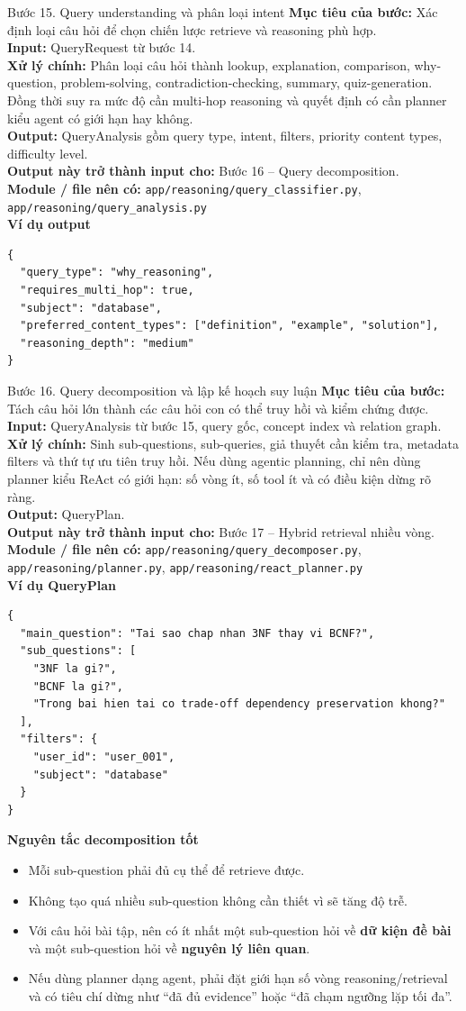 \documentclass[12pt,a4paper]{article}
\newcommand{\stepgoal}[1]{\textbf{Mục tiêu của bước:} #1\\}
\newcommand{\stepinput}[1]{\textbf{Input:} #1\\}
\newcommand{\stepprocess}[1]{\textbf{Xử lý chính:} #1\\}
\newcommand{\stepoutput}[1]{\textbf{Output:} #1\\}
\newcommand{\stepnext}[1]{\textbf{Output này trở thành input cho:} #1\\}
\newcommand{\stepmodules}[1]{\textbf{Module / file nên có:} #1\\}
\begin{document}
\begin{stepbox}{Bước 15. Query understanding và phân loại intent}
\stepgoal{Xác định loại câu hỏi để chọn chiến lược retrieve và reasoning phù hợp.}
\stepinput{QueryRequest từ bước 14.}
\stepprocess{Phân loại câu hỏi thành lookup, explanation, comparison, why-question, problem-solving, contradiction-checking, summary, quiz-generation. Đồng thời suy ra mức độ cần multi-hop reasoning và quyết định có cần planner kiểu agent có giới hạn hay không.}
\stepoutput{QueryAnalysis gồm query type, intent, filters, priority content types, difficulty level.}
\stepnext{Bước 16 -- Query decomposition.}
\stepmodules{\texttt{app/reasoning/query\_classifier.py}, \texttt{app/reasoning/query\_analysis.py}}

\textbf{Ví dụ output}
\begin{lstlisting}
{
  "query_type": "why_reasoning",
  "requires_multi_hop": true,
  "subject": "database",
  "preferred_content_types": ["definition", "example", "solution"],
  "reasoning_depth": "medium"
}
\end{lstlisting}
\end{stepbox}

\begin{stepbox}{Bước 16. Query decomposition và lập kế hoạch suy luận}
\stepgoal{Tách câu hỏi lớn thành các câu hỏi con có thể truy hồi và kiểm chứng được.}
\stepinput{QueryAnalysis từ bước 15, query gốc, concept index và relation graph.}
\stepprocess{Sinh sub-questions, sub-queries, giả thuyết cần kiểm tra, metadata filters và thứ tự ưu tiên truy hồi. Nếu dùng agentic planning, chỉ nên dùng planner kiểu ReAct có giới hạn: số vòng ít, số tool ít và có điều kiện dừng rõ ràng.}
\stepoutput{QueryPlan.}
\stepnext{Bước 17 -- Hybrid retrieval nhiều vòng.}
\stepmodules{\texttt{app/reasoning/query\_decomposer.py}, \texttt{app/reasoning/planner.py}, \texttt{app/reasoning/react\_planner.py}}

\textbf{Ví dụ QueryPlan}
\begin{lstlisting}
{
  "main_question": "Tai sao chap nhan 3NF thay vi BCNF?",
  "sub_questions": [
    "3NF la gi?",
    "BCNF la gi?",
    "Trong bai hien tai co trade-off dependency preservation khong?"
  ],
  "filters": {
    "user_id": "user_001",
    "subject": "database"
  }
}
\end{lstlisting}

\textbf{Nguyên tắc decomposition tốt}
\begin{itemize}
    \item Mỗi sub-question phải đủ cụ thể để retrieve được.
    \item Không tạo quá nhiều sub-question không cần thiết vì sẽ tăng độ trễ.
    \item Với câu hỏi bài tập, nên có ít nhất một sub-question hỏi về \textbf{dữ kiện đề bài} và một sub-question hỏi về \textbf{nguyên lý liên quan}.
    \item Nếu dùng planner dạng agent, phải đặt giới hạn số vòng reasoning/retrieval và có tiêu chí dừng như ``đã đủ evidence'' hoặc ``đã chạm ngưỡng lặp tối đa''.
\end{itemize}
\end{stepbox}
\end{document}
